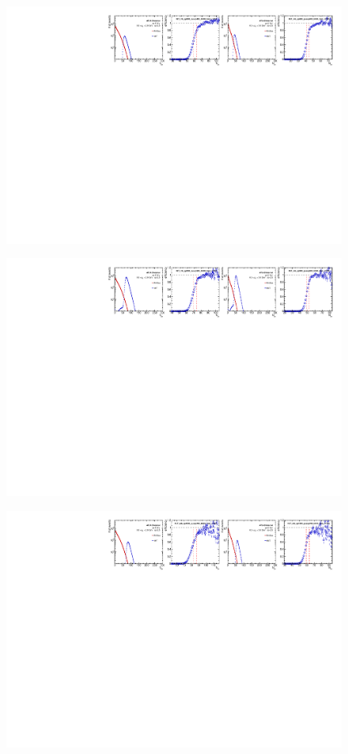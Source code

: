 \begin{figure}[H]
\centering
\includegraphics[width=1.\linewidth]{figs/sec_evtSlc/trigEff_pp5/trigEff_Trig18.pdf}
\end{figure}
\begin{figure}[H]
\centering
\includegraphics[width=1.\linewidth]{figs/sec_evtSlc/trigEff_pp5/trigEff_Trig19.pdf}
\end{figure}
\begin{figure}[H]
\centering
\includegraphics[width=1.\linewidth]{figs/sec_evtSlc/trigEff_pp5/trigEff_Trig20.pdf}
\end{figure}
